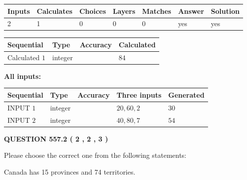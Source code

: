 \documentclass[12pt]{article}
\begin{document}
 

 
   
   
   
   
\noindent\begin{tabular}{|l|l|l|l|l|l|l|}
 \hline
Inputs & Calculates & Choices & Layers & Matches & Answer & Solution \\ \hline
 2  & 
 1  & 
 0
  & 
 0  & 
 0  & 
  yes & 
  yes 
  \\ \hline
 \end{tabular}
   
   
   
   
\noindent{}
   
   
  
  
\noindent\begin{tabular}{|l|l|l|l|}
\hline
 Sequential & Type & Accuracy & Calculated \\ 
\hline
 
 
  Calculated $  1 $ & integer &  & 
  $ 84 $ 
 \\  \hline  
 \end{tabular}
   
   
   
   
\noindent\vspace{0.1in}\hspace{-0.08in} {\textbf{\Large{All inputs: }}}
   
   
  
  
\noindent\begin{tabular}{|l|l|l|l|l|}
\hline
 Sequential & Type & Accuracy & Three inputs & Generated \\ 
\hline
 
 
  INPUT $  1 $ & integer &  & $
 20
 , 
 60
 , 
 2
 $ & $ 30 $ 
 \\  \hline  
 
 
  INPUT $  2 $ & integer &  & $
 40
 , 
 80
 , 
 7
 $ & $ 54 $ 
 \\  \hline  
 \end{tabular}
   
   
  
\vspace{0.2in}
  
{\textbf{\Large{QUESTION
557.2 
 ( 2 , 2 , 3 )
}}}
  
  
Please choose the correct one from the following statements:
 
 
Canada has  15 provinces and  74 territories.
 
\end{document}
